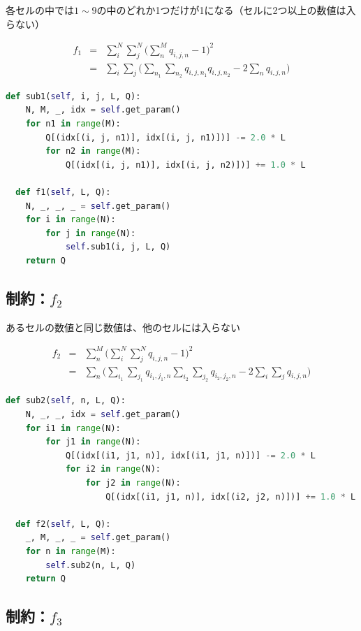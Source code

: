 \documentclass[uplatex,dvipdfmx,a4paper,11pt,oneside,openany]{jsbook}
\begin{document}
各セルの中では$1\sim 9$の中のどれか1つだけが1になる（セルに2つ以上の数値は入らない）

\begin{eqnarray*}
  f_1 &=& \sum_i^N\sum_j^N\bigg(\sum_n^M q_{i,j,n} - 1\bigg)^2\\
  &=& \sum_i\sum_j\bigg(\sum_{n_1}\sum_{n_2}q_{i,j,n_1}q_{i,j,n_2} - 2 \sum_n q_{i,j,n}\bigg)
\end{eqnarray*}

\begin{lstlisting}[language=Python]
  def sub1(self, i, j, L, Q):
    N, M, _, idx = self.get_param()
    for n1 in range(M):
        Q[(idx[(i, j, n1)], idx[(i, j, n1)])] -= 2.0 * L
        for n2 in range(M):
            Q[(idx[(i, j, n1)], idx[(i, j, n2)])] += 1.0 * L

  def f1(self, L, Q):
    N, _, _, _ = self.get_param()
    for i in range(N):
        for j in range(N):
            self.sub1(i, j, L, Q)
    return Q
\end{lstlisting}

\subsection{制約：$f_2$}

あるセルの数値と同じ数値は、他のセルには入らない

\begin{eqnarray*}
  f_2 &=& \sum_n^M\bigg(\sum_i^N\sum_j^N q_{i,j,n} - 1\bigg)^2\\
  &=& \sum_n\bigg(\sum_{i_1}\sum_{j_1}q_{i_1,j_1,n}\sum_{i_2}\sum_{j_2}q_{i_2,j_2,n} - 2 \sum_i\sum_j q_{i,j,n}\bigg)
\end{eqnarray*}

\begin{lstlisting}[language=Python]
  def sub2(self, n, L, Q):
    N, _, _, idx = self.get_param()
    for i1 in range(N):
        for j1 in range(N):
            Q[(idx[(i1, j1, n)], idx[(i1, j1, n)])] -= 2.0 * L
            for i2 in range(N):
                for j2 in range(N):
                    Q[(idx[(i1, j1, n)], idx[(i2, j2, n)])] += 1.0 * L

  def f2(self, L, Q):
    _, M, _, _ = self.get_param()
    for n in range(M):
        self.sub2(n, L, Q)
    return Q
\end{lstlisting}

\subsection{制約：$f_3$}
\end{document}
